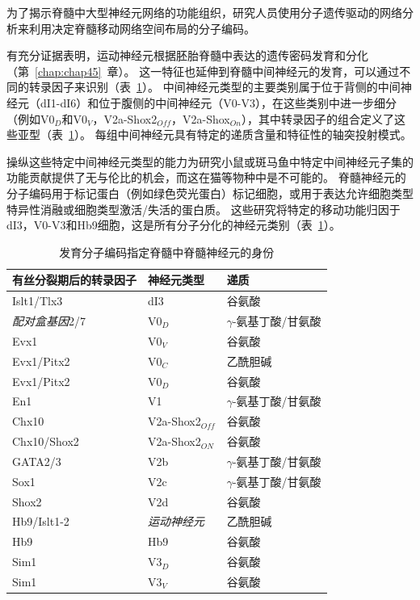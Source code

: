 \begin{proposition} \label{box:33_3}
	
	\quad \quad 为了揭示脊髓中大型神经元网络的功能组织，研究人员使用分子遗传驱动的网络分析来利用决定脊髓移动网络空间布局的分子编码。
	
	\quad \quad 有充分证据表明，运动神经元根据胚胎脊髓中表达的遗传密码发育和分化（第~\ref{chap:chap45}~章）。
	这一特征也延伸到脊髓中间神经元的发育，可以通过不同的转录因子来识别（表~\ref{tab:33_1}）。
	中间神经元类型的主要类别属于位于背侧的中间神经元（dI1-dI6）和位于腹侧的中间神经元（V0-V3），在这些类别中进一步细分（例如V0$_D$和V0$_V$，V2a-Shox2$_{Off}$，V2a-Shox$_{On}$），其中转录因子的组合定义了这些亚型（表~\ref{tab:33_1}）。
	每组中间神经元具有特定的递质含量和特征性的轴突投射模式。
	
	\quad \quad 操纵这些特定中间神经元类型的能力为研究小鼠或斑马鱼中特定中间神经元子集的功能贡献提供了无与伦比的机会，而这在猫等物种中是不可能的。
	脊髓神经元的分子编码用于标记蛋白（例如绿色荧光蛋白）标记细胞，或用于表达允许细胞类型特异性消融或细胞类型激活/失活的蛋白质。
	这些研究将特定的移动功能归因于dI3，V0-V3和Hb9细胞，这是所有分子分化的神经元类别（表~\ref{tab:33_1}）。
	
\end{proposition}


\begin{table}[htbp]
	\caption{发育分子编码指定脊髓中脊髓神经元的身份} \label{tab:33_1} \centering
	\begin{tabular}{lll}
		\toprule
		有丝分裂期后的转录因子 & 神经元类型 & 递质 \\
		\midrule
		Islt1/Tlx3 & dI3 & 谷氨酸  \\
		\textit{配对盒基因}2/7 & V0$_D$ & $\gamma$-氨基丁酸/甘氨酸  \\
		Evx1 & V0$_V$ & 谷氨酸  \\
		Evx1/Pitx2 & V0$_C$ & 乙酰胆碱  \\
		Evx1/Pitx2 & V0$_D$ & 谷氨酸  \\
		En1 & V1 & $\gamma$-氨基丁酸/甘氨酸  \\
		Chx10 & V2a-Shox2$_{Off}$ & 谷氨酸  \\
		Chx10/Shox2 & V2a-Shox2$_{ON}$ & 谷氨酸  \\
		GATA2/3 & V2b & $\gamma$-氨基丁酸/甘氨酸  \\
		Sox1 & V2c & $\gamma$-氨基丁酸/甘氨酸  \\
		Shox2 & V2d & 谷氨酸  \\
		Hb9/Islt1-2 & \textit{运动神经元} & 乙酰胆碱  \\
		Hb9 & Hb9 & 谷氨酸  \\
		Sim1 & V3$_D$ & 谷氨酸  \\
		Sim1 & V3$_V$ & 谷氨酸  \\
		\bottomrule
	\end{tabular}
\end{table}


